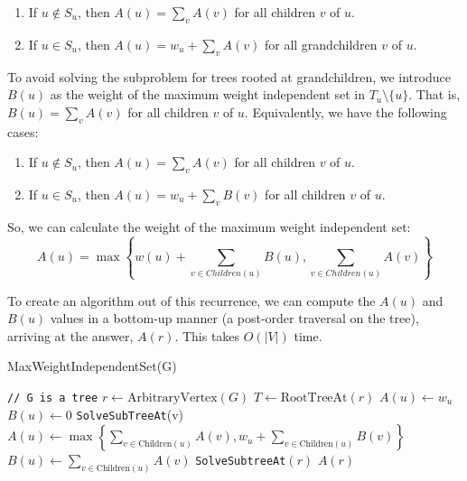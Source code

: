 \documentclass [12pt]{article}
\theoremstyle{definition}
\begin{document}
\begin{enumerate}
    \item If $u \notin S_u$, then $A(u) = \sum_{v} A(v )$ for all children $v$ of $u$.
    \item If $u \in S_u$, then $A(u) = w_u + \sum_{v} A(v )$ for all grandchildren $v$ of $u$. 
\end{enumerate}

To avoid solving the subproblem for trees rooted at grandchildren, we introduce $B(u)$ as the weight of the maximum weight independent set in $T_u \setminus \{u\}$. That is, $B(u) = \sum_{v} A(v )$ for all children $v$ of $u$. Equivalently, we have the following cases: 

\begin{enumerate}
    \item If $u \notin S_u$, then $A(u) = \sum_{v} A(v )$ for all children $v$ of $u$.
    \item If $u \in S_u$, then $A(u) = w_u + \sum_{v} B(v )$ for all children $v$ of $u$. 
\end{enumerate}

So, we can calculate the weight of the maximum weight independent set:
$$
A(u) = \max\left\{w(u) + \sum_{v \in Children(u)} B(u), \sum_{v \in Children(u)} A(v)  \right\}
$$

To create an algorithm out of this recurrence, we can compute the $A(u)$ and $B(u)$ values in a bottom-up manner (a post-order traversal on the tree), arriving at the answer, $A(r)$. This
takes $O(|V|)$ time.




\begin{algorithm}
\caption{MaxWeightIndependentSet(G)}
\label{alg:MaxWeightIndependentSet}
\begin{algorithmic}
\State \texttt{// G is a tree}
\State $r \gets \text{ArbitraryVertex}(G)$
\State $T \gets \text{RootTreeAt}(r)$
    \State {} {
        $A(u) \gets w_u$
        $B(u) \gets 0$
    }{
         {
            \texttt{SolveSubTreeAt}(v)
        }
        $A(u) \gets \max\left\{\sum_{v \in \text{Children}(u)} A(v), w_u + \sum_{v \in \text{Children}(u)} B(v) \right\}$
        $B(u) \gets \sum_{v \in \text{Children}(u)} A(v)$
    }
\EndProcedure
\State \texttt{SolveSubtreeAt}$(r)$
\Return $A(r)$
\end{algorithmic}
\end{algorithm}
\end{document}
